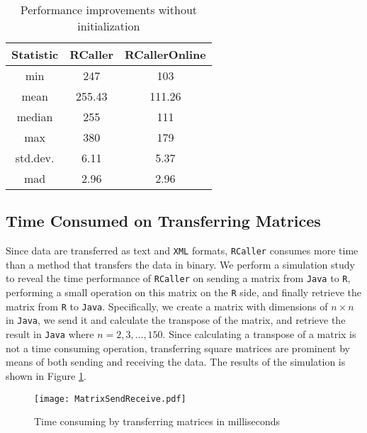 \documentclass[10pt,a4paper, final, oneside]{article}
\begin{document}
\begin{table}[H]
\begin{center}
\caption{Performance improvements without initialization}
\label{tbl:performance_improvements_without_init}
\begin{tabular}{|c|cc|}

\hline
Statistic & RCaller & RCallerOnline \\
\hline
min       &   247     &  103           \\
mean      &   255.43  &  111.26         \\
median    &   255     &  111             \\
max       &   380     &  179            \\
\hline
std.dev.  &   6.11   &  5.37            \\
mad       &   2.96   &  2.96             \\
\hline
\end{tabular}
\end{center}
\end{table}




\subsection{Time Consumed on Transferring Matrices}
\label{sec:time_consumed_transfer_matrix}
Since data are transferred as text and \texttt{XML} formats, \texttt{RCaller} consumes more time than a method that transfers the data in binary. We perform a simulation study to reveal the time performance of \texttt{RCaller} on sending a matrix from \texttt{Java} to \texttt{R}, performing a small operation on this matrix on the \texttt{R} side, and finally retrieve the matrix from \texttt{R} to \texttt{Java}. Specifically, we create a matrix with dimensions of $n \times n$ in \texttt{Java}, we send it and calculate the transpose of the matrix, and retrieve the result in \texttt{Java} where $n = 2, 3, ..., 150$. Since calculating a transpose of a matrix is not a time consuming operation, transferring square matrices are prominent by means of both sending and receiving the data. The results of the simulation is shown in Figure \ref{fig:time_consuming_transfer_matrix}. 

\begin{figure}
\centering
	\texttt{[image: MatrixSendReceive.pdf]}
	\caption{Time consuming by transferring matrices in milliseconds}
	\label{fig:time_consuming_transfer_matrix}
\end{figure}
\end{document}

